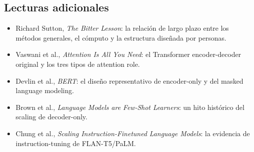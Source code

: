 \subsection{Lecturas adicionales}

\begin{itemize}
  \item Richard Sutton, \emph{The Bitter Lesson}: la relación de largo plazo entre los métodos generales, el cómputo y la estructura diseñada por personas.
  \item Vaswani et al., \emph{Attention Is All You Need}: el Transformer encoder-decoder original y los tres tipos de attention role.
  \item Devlin et al., \emph{BERT}: el diseño representativo de encoder-only y del masked language modeling.
  \item Brown et al., \emph{Language Models are Few-Shot Learners}: un hito histórico del scaling de decoder-only.
  \item Chung et al., \emph{Scaling Instruction-Finetuned Language Models}: la evidencia de instruction-tuning de FLAN-T5/PaLM.
\end{itemize}


